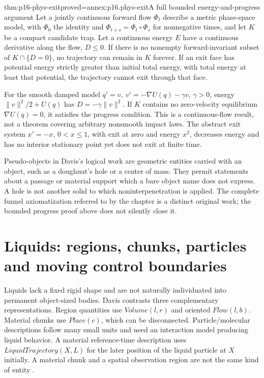 \begin{hbtheorem}{thm:p16-phys-exit}{proved=annex:p16.phys-exit}{A full bounded energy-and-progress argument}
Let a jointly continuous forward flow \(\Phi_t\) describe a metric
phase-space model, with \(\Phi_0\) the identity and
\(\Phi_{t+s}=\Phi_t\circ\Phi_s\) for nonnegative times,
and let \(K\) be a compact candidate trap. Let a continuous energy \(E\)
have a continuous derivative along the flow, \(D\le0\). If there is
no nonempty forward-invariant subset of \(K\cap\{D=0\}\), no trajectory
can remain in \(K\) forever. If an exit face has potential energy strictly
greater than initial total energy, with total energy at least that potential,
the trajectory cannot exit through that face.

For the smooth damped model \(q'=v,\ v'=-\nabla U(q)-\gamma v\),
\(\gamma>0\), energy \(\|v\|^2/2+U(q)\) has
\(D=-\gamma\|v\|^2\). If \(K\) contains no zero-velocity
equilibrium \(\nabla U(q)=0\), it satisfies the progress condition.
This is a continuous-flow result, not a theorem covering arbitrary nonsmooth
impact laws. The abstract exit system \(x'=-x\), \(0<x\le1\),
with exit at zero and energy \(x^2\), decreases energy and has no interior
stationary point yet does not exit at finite time.
\end{hbtheorem}

Pseudo-objects in Davis's logical work are geometric entities carried with
an object, such as a doughnut's hole or a center of mass. They permit
statements about a passage or material support which a bare object name
does not express. A hole is not another solid to which noninterpenetration
is applied. The complete funnel axiomatization referred to by the
chapter is a distinct original work; the bounded progress proof above does
not silently close it.

\section{Liquids: regions, chunks, particles and moving control boundaries}
\label{sec:p16-phys-liquid-ontology}

Liquids lack a fixed rigid shape and are not naturally individuated into
permanent object-sized bodies. Davis contrasts three complementary
representations. Region quantities use \(Volume(l,r)\) and oriented
\(Flow(l,b)\). Material chunks use \(Place(c)\), which can be disconnected.
Particle/molecular descriptions follow many small units and need an interaction
model producing liquid behavior. A material reference-time description uses
\(LiquidTrajectory(X,L)\) for the later position of the liquid particle
at \(X\) initially. A material chunk and a spatial observation region
are not the same kind of entity
\cite[pp.~608--610]{Davis2008PhysicalReasoning}.

